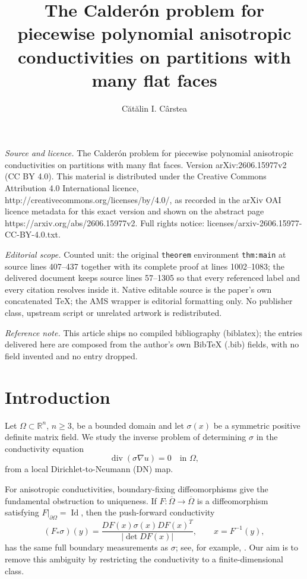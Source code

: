\documentclass[10pt,a4paper]{amsart}
\newcommand{\R}{\mathbb R}
\newcommand{\diver}{\operatorname{div}}
\newcommand{\Id}{\operatorname{Id}}
\begin{document}
\title[The Calder'on problem for piecewise polynomial anisotropic c]{The Calder\'on problem for piecewise polynomial anisotropic conductivities on partitions with many flat faces}
\author{Cătălin I. Cârstea}
\date{}
\maketitle
\noindent\emph{Source and licence.} The Calder\'on problem for piecewise polynomial anisotropic conductivities on partitions with many flat faces. Version arXiv:2606.15977v2 (CC BY 4.0). This material is distributed under the Creative Commons Attribution 4.0 International licence, http://creativecommons.org/licenses/by/4.0/, as recorded in the arXiv OAI licence metadata for this exact version and shown on the abstract page https://arxiv.org/abs/2606.15977v2. Full rights notice: licenses/arxiv-2606.15977-CC-BY-4.0.txt.\par\smallskip
\noindent\textit{Editorial scope.} Counted unit: the original \texttt{theorem} environment \texttt{thm:main} at source lines 407--437 together with its complete proof at lines 1002--1083; the delivered document keeps source lines 57--1305 so that every referenced label and every citation resolves inside it. Native editable source is the paper's own concatenated TeX; the AMS wrapper is editorial formatting only. No publisher class, upstream script or unrelated artwork is redistributed.
\par\smallskip\noindent\textit{Reference note.} This article ships no compiled bibliography (biblatex); the entries delivered here are composed from the author's own BibTeX (.bib) fields, with no field invented and no entry dropped.
\section{Introduction}

Let \(\Omega\subset \R^n\), \(n\ge 3\), be a bounded domain and let
\(\sigma(x)\) be a symmetric positive definite matrix field.  We study the
inverse problem of determining \(\sigma\) in the conductivity equation
\begin{equation}
  \diver(\sigma \nabla u)=0\quad\text{in }\Omega,
  \label{eq:conductivity-equation}
\end{equation}
from a local Dirichlet-to-Neumann (DN) map.

For anisotropic conductivities, boundary-fixing diffeomorphisms give the
fundamental obstruction to uniqueness.  If
\(F:\overline\Omega\to\overline\Omega\) is a diffeomorphism satisfying
\(F|_{\partial\Omega}=\Id\), then the push-forward conductivity
\begin{equation}
  (F_*\sigma)(y)=
  \frac{DF(x)\sigma(x)DF(x)^T}{|\det DF(x)|},
  \qquad x=F^{-1}(y),
  \label{eq:gauge}
\end{equation}
has the same full boundary measurements as \(\sigma\); see, for example,
\cite{LassasUhlmann2001,LeeUhlmann1989,Sylvester1990}.  Our aim is to remove
this ambiguity by restricting the conductivity to a finite-dimensional class.
\end{document}
